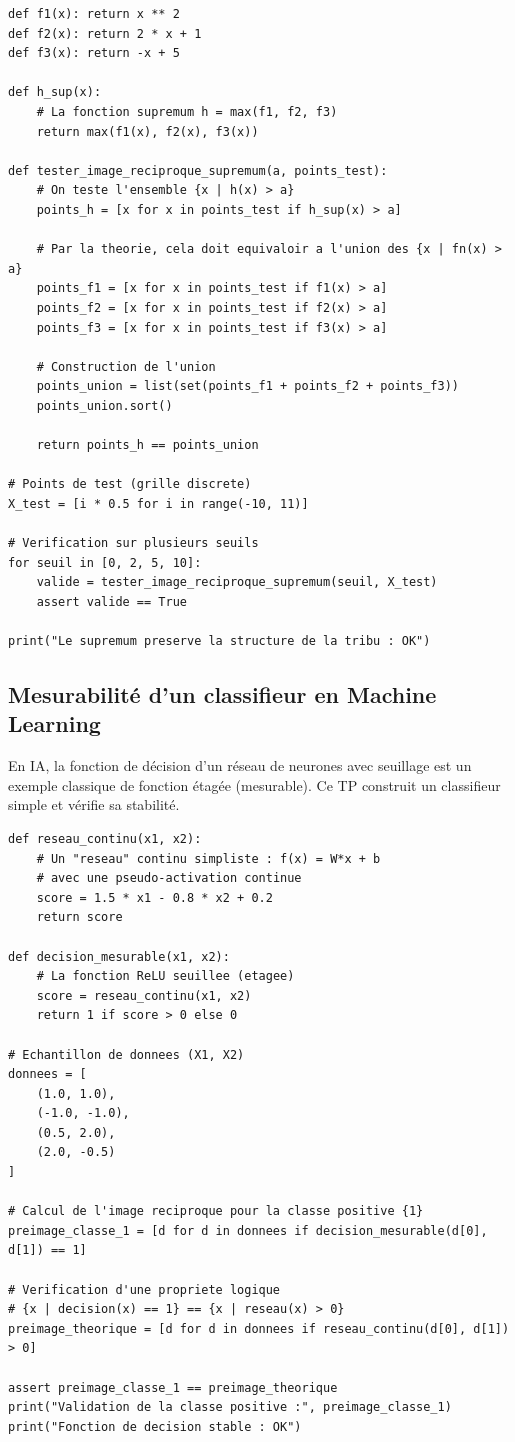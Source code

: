 \documentclass[11pt,a4paper]{article}
\begin{document}
\begin{lstlisting}
def f1(x): return x ** 2
def f2(x): return 2 * x + 1
def f3(x): return -x + 5

def h_sup(x):
    # La fonction supremum h = max(f1, f2, f3)
    return max(f1(x), f2(x), f3(x))

def tester_image_reciproque_supremum(a, points_test):
    # On teste l'ensemble {x | h(x) > a}
    points_h = [x for x in points_test if h_sup(x) > a]

    # Par la theorie, cela doit equivaloir a l'union des {x | fn(x) > a}
    points_f1 = [x for x in points_test if f1(x) > a]
    points_f2 = [x for x in points_test if f2(x) > a]
    points_f3 = [x for x in points_test if f3(x) > a]

    # Construction de l'union
    points_union = list(set(points_f1 + points_f2 + points_f3))
    points_union.sort()

    return points_h == points_union

# Points de test (grille discrete)
X_test = [i * 0.5 for i in range(-10, 11)]

# Verification sur plusieurs seuils
for seuil in [0, 2, 5, 10]:
    valide = tester_image_reciproque_supremum(seuil, X_test)
    assert valide == True

print("Le supremum preserve la structure de la tribu : OK")
\end{lstlisting}


\vspace{0.5cm}

\subsection*{Mesurabilité d'un classifieur en Machine Learning}

En IA, la fonction de décision d'un réseau de neurones avec seuillage est un exemple classique de fonction étagée (mesurable). Ce TP construit un classifieur simple et vérifie sa stabilité.

\begin{lstlisting}
def reseau_continu(x1, x2):
    # Un "reseau" continu simpliste : f(x) = W*x + b
    # avec une pseudo-activation continue
    score = 1.5 * x1 - 0.8 * x2 + 0.2
    return score

def decision_mesurable(x1, x2):
    # La fonction ReLU seuillee (etagee)
    score = reseau_continu(x1, x2)
    return 1 if score > 0 else 0

# Echantillon de donnees (X1, X2)
donnees = [
    (1.0, 1.0),
    (-1.0, -1.0),
    (0.5, 2.0),
    (2.0, -0.5)
]

# Calcul de l'image reciproque pour la classe positive {1}
preimage_classe_1 = [d for d in donnees if decision_mesurable(d[0], d[1]) == 1]

# Verification d'une propriete logique
# {x | decision(x) == 1} == {x | reseau(x) > 0}
preimage_theorique = [d for d in donnees if reseau_continu(d[0], d[1]) > 0]

assert preimage_classe_1 == preimage_theorique
print("Validation de la classe positive :", preimage_classe_1)
print("Fonction de decision stable : OK")
\end{lstlisting}
\end{document}
